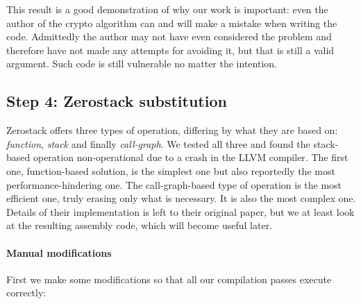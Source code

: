 \documentclass[a4paper,10pt,openright]{memoir}
\newcommand{\term}[1]{\textit{#1}}
\begin{document}
This result is a good demonstration of why our work is important: even 
the author of the crypto algorithm can and will make a mistake when 
writing the code. Admittedly the author may not have even considered 
the problem and therefore have not made any attempts for avoiding it, 
but that is still a valid argument. Such code is still vulnerable no 
matter the intention.


\subsection{Step 4: Zerostack substitution}

Zerostack offers three types of operation, differing by what 
they are based on: \term{function}, \term{stack} and finally 
\term{call-graph}. We tested all three and found the stack-based 
operation non-operational due to a crash in the LLVM compiler. The 
first one, function-based solution, is the simplest one but also 
reportedly\cite{whatyouc} the most performance-hindering one. The 
call-graph-based type of operation is the most efficient one, truly 
erasing only what is necessary. It is also the most complex one. 
Details of their implementation is left to their original 
paper\cite{whatyouc}, but we at least look at the resulting assembly 
code, which will become useful later.

\paragraph{Manual modifications}

First we make some modifications so that all our compilation passes 
execute correctly:
\end{document}
